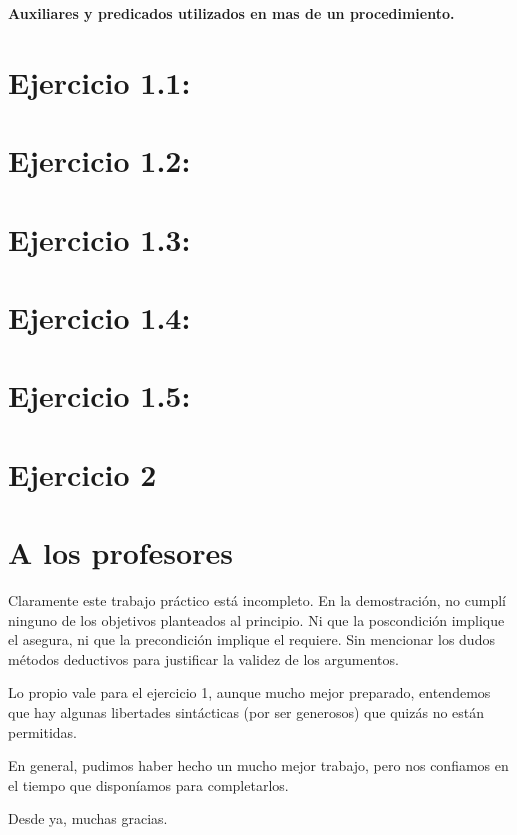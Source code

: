 \documentclass[10pt,a4paper]{article}
\begin{document}
\maketitle
\textbf{\Large{Auxiliares y predicados \small{utilizados en mas de un procedimiento.}}}\\

\section*{Ejercicio 1.1:}

\section*{Ejercicio 1.2:}

\pagebreak
\section*{Ejercicio 1.3:}

\section*{Ejercicio 1.4:}

\section*{Ejercicio 1.5:}

\section*{Ejercicio 2}


\section*{A los profesores}

Claramente este trabajo práctico está incompleto. En la demostración, no cumplí ninguno de los objetivos planteados al principio. Ni que la poscondición implique el asegura, ni que la precondición implique el requiere. Sin mencionar los dudos métodos deductivos para justificar la validez de los argumentos.

Lo propio vale para el ejercicio 1, aunque mucho mejor preparado, entendemos que hay algunas libertades sintácticas (por ser generosos) que quizás no están permitidas.

En general, pudimos haber hecho un mucho mejor trabajo, pero nos confiamos en el tiempo que disponíamos para completarlos.

Desde ya, muchas gracias.
\end{document}

